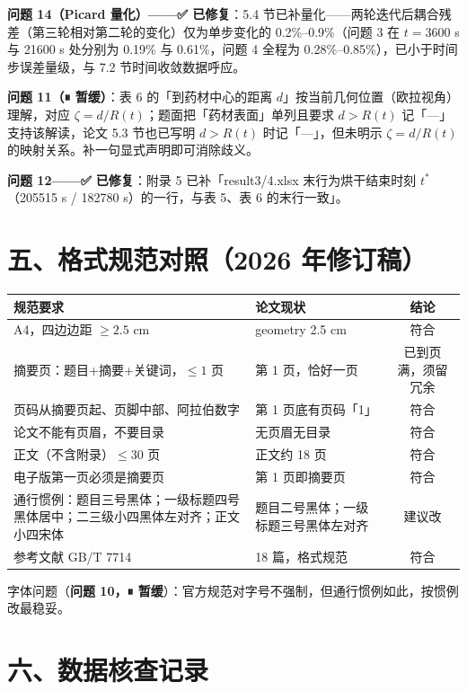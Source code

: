 \documentclass[12pt,a4paper]{ctexart}
\begin{document}
\textbf{问题 14（Picard 量化）——✅ 已修复}：5.4 节已补量化——两轮迭代后耦合残差（第三轮相对第二轮的变化）仅为单步变化的 0.2\%--0.9\%（问题 3 在 $t=3600$ s 与 21600 s 处分别为 0.19\% 与 0.61\%，问题 4 全程为 0.28\%--0.85\%），已小于时间步误差量级，与 7.2 节时间收敛数据呼应。

\textbf{问题 11（⏸ 暂缓）}：表 6 的「到药材中心的距离 $d$」按当前几何位置（欧拉视角）理解，对应 $\zeta=d/R(t)$；题面把「药材表面」单列且要求 $d>R(t)$ 记「---」支持该解读，论文 5.3 节也已写明 $d>R(t)$ 时记「---」，但未明示 $\zeta=d/R(t)$ 的映射关系。补一句显式声明即可消除歧义。

\textbf{问题 12——✅ 已修复}：附录 5 已补「result3/4.xlsx 末行为烘干结束时刻 $t^*$（205515 s / 182780 s）的一行，与表 5、表 6 的末行一致」。

\section{五、格式规范对照（2026 年修订稿）}

\begin{center}
{\begin{tabular}{p{6.2cm}p{5.2cm}c}
\toprule
规范要求 & 论文现状 & 结论 \\
\midrule
A4，四边边距 $\ge2.5$ cm & geometry 2.5 cm & 符合 \\
摘要页：题目+摘要+关键词，$\le1$ 页 & 第 1 页，恰好一页 & 已到页满，须留冗余 \\
页码从摘要页起、页脚中部、阿拉伯数字 & 第 1 页底有页码「1」 & 符合 \\
论文不能有页眉，不要目录 & 无页眉无目录 & 符合 \\
正文（不含附录）$\le30$ 页 & 正文约 18 页 & 符合 \\
电子版第一页必须是摘要页 & 第 1 页即摘要页 & 符合 \\
通行惯例：题目三号黑体；一级标题四号黑体居中；二三级小四黑体左对齐；正文小四宋体 & 题目二号黑体；一级标题三号黑体左对齐 & 建议改 \\
参考文献 GB/T 7714 & 18 篇，格式规范 & 符合 \\
\bottomrule
\end{tabular}}
\end{center}

字体问题（\textbf{问题 10，⏸ 暂缓}）：官方规范对字号不强制，但通行惯例如此，按惯例改最稳妥。

\section{六、数据核查记录}
\end{document}
